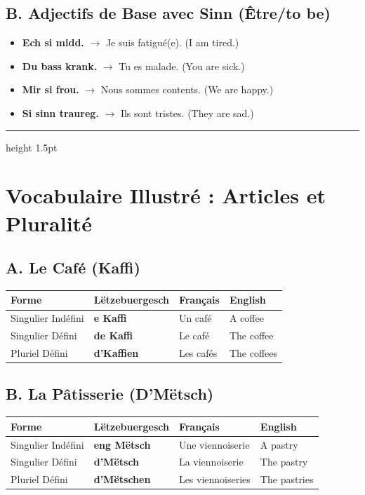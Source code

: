 	\subsection*{B. Adjectifs de Base avec \textbf{Sinn} (Être/to be)}
	\begin{itemize}
		\item \textbf{Ech si midd.} \quad $\rightarrow$ Je suis fatigué(e). (I am tired.)
		\item \textbf{Du bass krank.} \quad $\rightarrow$ Tu es malade. (You are sick.)
		\item \textbf{Mir si frou.} \quad $\rightarrow$ Nous sommes contents. (We are happy.)
		\item \textbf{Si sinn traureg.} \quad $\rightarrow$ Ils sont tristes. (They are sad.)
	\end{itemize}
	
	\vspace{1em}\color{geminiBlue}\hrule height 1.5pt \vspace{0.5em}\color{black}
	
	\section{Vocabulaire Illustré : Articles et Pluralité}

	
	\subsection*{A. Le Café (\textbf{Kaffi})}
	\begin{tabular}{l l l l}
		\toprule
		\textbf{Forme} & \textbf{Lëtzebuergesch} & \textbf{Français} & \textbf{English} \\
		\midrule
		Singulier Indéfini & \textbf{e Kaffi} & Un café & A coffee \\
		Singulier Défini & \textbf{de Kaffi} & Le café & The coffee \\
		Pluriel Défini & \textbf{d'Kaffien} & Les cafés & The coffees \\
		\bottomrule
	\end{tabular}
	
	\subsection*{B. La Pâtisserie (\textbf{D'Mëtsch})}
	\begin{tabular}{l l l l}
		\toprule
		\textbf{Forme} & \textbf{Lëtzebuergesch} & \textbf{Français} & \textbf{English} \\
		\midrule
		Singulier Indéfini & \textbf{eng Mëtsch} & Une viennoiserie & A pastry \\
		Singulier Défini & \textbf{d'Mëtsch} & La viennoiserie & The pastry \\
		Pluriel Défini & \textbf{d'Mëtschen} & Les viennoiseries & The pastries \\
		\bottomrule
	\end{tabular}
	
